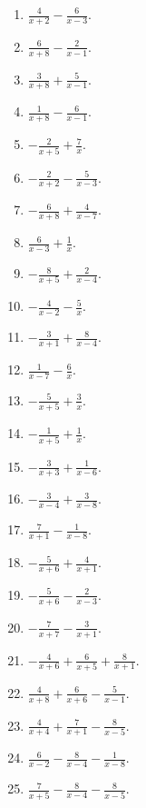 \documentclass[11pt,oneside]{book}
\begin{document}
\begin{enumerate}[leftmargin=*,label=\textbf{S\arabic*.},itemsep=0.45\baselineskip]
\item $\displaystyle \frac{4}{x + 2} - \frac{6}{x - 3}$.
\item $\displaystyle \frac{6}{x + 8} - \frac{2}{x - 1}$.
\item $\displaystyle \frac{3}{x + 8} + \frac{5}{x - 1}$.
\item $\displaystyle \frac{1}{x + 8} - \frac{6}{x - 1}$.
\item $\displaystyle - \frac{2}{x + 5} + \frac{7}{x}$.
\item $\displaystyle - \frac{2}{x + 2} - \frac{5}{x - 3}$.
\item $\displaystyle - \frac{6}{x + 8} + \frac{4}{x - 7}$.
\item $\displaystyle \frac{6}{x - 3} + \frac{1}{x}$.
\item $\displaystyle - \frac{8}{x + 5} + \frac{2}{x - 4}$.
\item $\displaystyle - \frac{4}{x - 2} - \frac{5}{x}$.
\item $\displaystyle - \frac{3}{x + 1} + \frac{8}{x - 4}$.
\item $\displaystyle \frac{1}{x - 7} - \frac{6}{x}$.
\item $\displaystyle - \frac{5}{x + 5} + \frac{3}{x}$.
\item $\displaystyle - \frac{1}{x + 5} + \frac{1}{x}$.
\item $\displaystyle - \frac{3}{x + 3} + \frac{1}{x - 6}$.
\item $\displaystyle - \frac{3}{x - 4} + \frac{3}{x - 8}$.
\item $\displaystyle \frac{7}{x + 1} - \frac{1}{x - 8}$.
\item $\displaystyle - \frac{5}{x + 6} + \frac{4}{x + 1}$.
\item $\displaystyle - \frac{5}{x + 6} - \frac{2}{x - 3}$.
\item $\displaystyle - \frac{7}{x + 7} - \frac{3}{x + 1}$.
\item $\displaystyle - \frac{4}{x + 6} + \frac{6}{x + 5} + \frac{8}{x + 1}$.
\item $\displaystyle \frac{4}{x + 8} + \frac{6}{x + 6} - \frac{5}{x - 1}$.
\item $\displaystyle \frac{4}{x + 4} + \frac{7}{x + 1} - \frac{8}{x - 5}$.
\item $\displaystyle \frac{6}{x - 2} - \frac{8}{x - 4} - \frac{1}{x - 8}$.
\item $\displaystyle \frac{7}{x + 5} - \frac{8}{x - 4} - \frac{8}{x - 5}$.

\end{enumerate}
\end{document}

